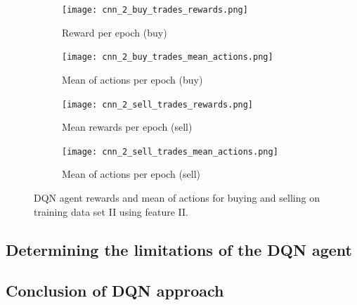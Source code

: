 \begin{figure}[H]
    \centering
    \begin{subfigure}[b]{0.45\textwidth}
        \texttt{[image: cnn\_2\_buy\_trades\_rewards.png]}
        \caption{Reward per epoch (buy)}
        \label{fig:analysis-dqn-1-trades-reward-buy}
    \end{subfigure}
    \begin{subfigure}[b]{0.45\textwidth}
        \texttt{[image: cnn\_2\_buy\_trades\_mean\_actions.png]}
        \caption{Mean of actions per epoch (buy)}
        \label{fig:analysis-dqn-1-trades-action-buy}
    \end{subfigure}
    \begin{subfigure}[b]{0.45\textwidth}
        \texttt{[image: cnn\_2\_sell\_trades\_rewards.png]}
        \caption{Mean rewards per epoch (sell)}
        \label{fig:analysis-dqn-1-trades-reward-sell}
    \end{subfigure}
    \begin{subfigure}[b]{0.45\textwidth}
        \texttt{[image: cnn\_2\_sell\_trades\_mean\_actions.png]}
        \caption{Mean of actions per epoch (sell)}
        \label{fig:analysis-dqn-1-trades-action-sell}
    \end{subfigure}
    \caption{DQN agent rewards and mean of actions for buying and selling on training data set II using feature II.}
    \label{fig:analysis-dqn-2}
\end{figure}

\subsection{Determining the limitations of the DQN agent}

\subsection{Conclusion of DQN approach}